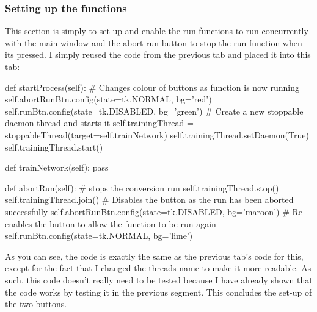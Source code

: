 \documentclass{report}
\begin{document}
\subsubsection{Setting up the functions}
This section is simply to set up and enable the run functions to run concurrently with the main window and the abort run button to stop the run function when its pressed.
\newline I simply reused the code from the previous tab and placed it into this tab:
\begin{python}
def startProcess(self):
    # Changes colour of buttons as function is now running
    self.abortRunBtn.config(state=tk.NORMAL, bg='red')
    self.runBtn.config(state=tk.DISABLED, bg='green')
    # Create a new stoppable daemon thread and starts it
    self.trainingThread = stoppableThread(target=self.trainNetwork)
    self.trainingThread.setDaemon(True)
    self.trainingThread.start()

def trainNetwork(self):
    pass

def abortRun(self):
    # stops the conversion run
    self.trainingThread.stop()
    self.trainingThread.join()
    # Disables the button as the run has been aborted successfully
    self.abortRunBtn.config(state=tk.DISABLED, bg='maroon')
    # Re-enables the button to allow the function to be run again
    self.runBtn.config(state=tk.NORMAL, bg='lime')
\end{python}
As you can see, the code is exactly the same as the previous tab's code for this, except for the fact that I changed the threads name to make it more readable.
\newline
As such, this code doesn't really need to be tested because I have already shown that the code works by testing it in the previous segment.
\newline
This concludes the set-up of the two buttons.
\end{document}
